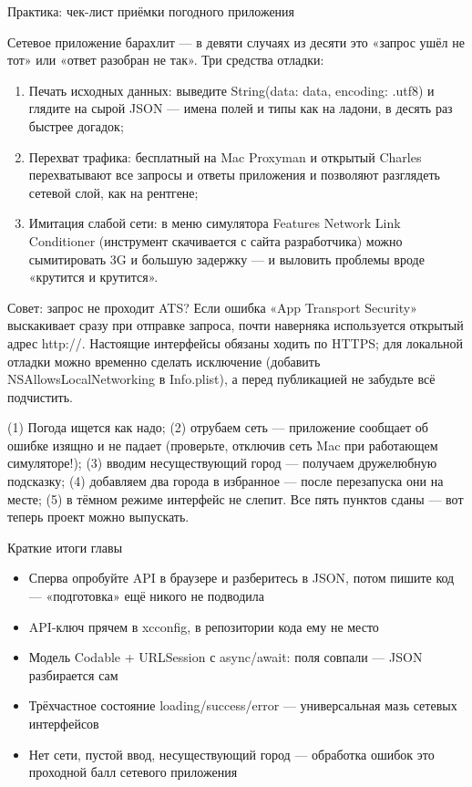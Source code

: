 \begin{tcbpractice}{Практика: чек-лист приёмки погодного приложения}

Сетевое приложение барахлит — в девяти случаях из десяти это «запрос ушёл не тот» или «ответ разобран не так». Три средства отладки:

\begin{enumerate}
  \item Печать исходных данных: выведите String(data: data, encoding: .utf8) и глядите на сырой JSON — имена полей и типы как на ладони, в десять раз быстрее догадок;
  \item Перехват трафика: бесплатный на Mac Proxyman и открытый Charles перехватывают все запросы и ответы приложения и позволяют разглядеть сетевой слой, как на рентгене;
  \item Имитация слабой сети: в меню симулятора Features Network Link Conditioner (инструмент скачивается с сайта разработчика) можно сымитировать 3G и большую задержку — и выловить проблемы вроде «крутится и крутится».
\end{enumerate}

\begin{tcbinfo}{Совет: запрос не проходит ATS?}
Если ошибка «App Transport Security» выскакивает сразу при отправке запроса, почти наверняка используется открытый адрес http://. Настоящие интерфейсы обязаны ходить по HTTPS; для локальной отладки можно временно сделать исключение (добавить NSAllowsLocalNetworking в Info.plist), а перед публикацией не забудьте всё подчистить.

\end{tcbinfo}

(1) Погода ищется как надо; (2) отрубаем сеть — приложение сообщает об ошибке изящно и не падает (проверьте, отключив сеть Mac при работающем симуляторе!); (3) вводим несуществующий город — получаем дружелюбную подсказку; (4) добавляем два города в избранное — после перезапуска они на месте; (5) в тёмном режиме интерфейс не слепит. Все пять пунктов сданы — вот теперь проект можно выпускать.

\end{tcbpractice}

\begin{tcbsummary}{Краткие итоги главы}
\begin{itemize}
  \item Сперва опробуйте API в браузере и разберитесь в JSON, потом пишите код — «подготовка» ещё никого не подводила
  \item API-ключ прячем в xcconfig, в репозитории кода ему не место
  \item Модель Codable + URLSession с async/await: поля совпали — JSON разбирается сам
  \item Трёхчастное состояние loading/success/error — универсальная мазь сетевых интерфейсов
  \item Нет сети, пустой ввод, несуществующий город — обработка ошибок это проходной балл сетевого приложения
\end{itemize}

\end{tcbsummary}
